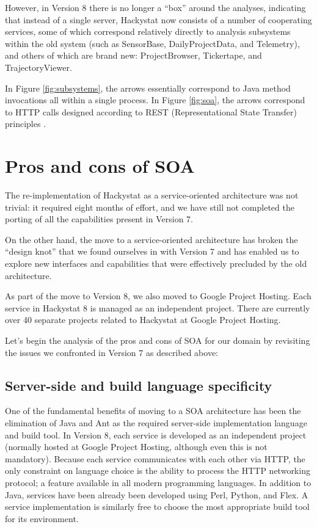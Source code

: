 \documentclass[conference,compsoc]{IEEEtran}
\begin{document}
However, in Version 8 there is no longer a ``box'' around the analyses,
indicating that instead of a single server, Hackystat now consists of a
number of cooperating services, some of which correspond relatively
directly to analysis subsystems within the old system (such as SensorBase,
DailyProjectData, and Telemetry), and others of which are brand new:
ProjectBrowser, Tickertape, and TrajectoryViewer.

In Figure \ref{fig:subsystems}, the arrows essentially correspond to Java
method invocations all within a single process.  In Figure \ref{fig:soa},
the arrows correspond to HTTP calls designed according to REST
(Representational State Transfer) principles \cite{Fielding02}.

\section{Pros and cons of SOA}
\label{sec:discussion}

The re-implementation of Hackystat as a service-oriented architecture was
not trivial: it required eight months of effort, and we have still not
completed the porting of all the capabilities present in Version 7.  

On the other hand, the move to a service-oriented architecture has broken
the ``design knot'' that we found ourselves in with Version 7 and has
enabled us to explore new interfaces and capabilities that were effectively
precluded by the old architecture.  

As part of the move to Version 8, we also moved to Google Project Hosting.
Each service in Hackystat 8 is managed as an independent project.  There
are currently over 40 separate projects related to Hackystat at Google
Project Hosting. 

Let's begin the analysis of the pros
and cons of SOA for our domain by revisiting the issues we confronted in
Version 7 as described above:

\subsection{Server-side and build language specificity}

One of the fundamental benefits of moving to a SOA architecture has been
the elimination of Java and Ant as the required server-side implementation
language and build tool.  In Version 8, each service is developed as an
independent project (normally hosted at Google Project Hosting, although
even this is not mandatory).  Because each service communicates with each
other via HTTP, the only constraint on language choice is the ability to
process the HTTP networking protocol; a feature available in all modern
programming languages.  In addition to Java, services have been already
been developed using Perl, Python, and Flex.  A service implementation is
similarly free to choose the most appropriate build tool for its
environment.
\end{document}
